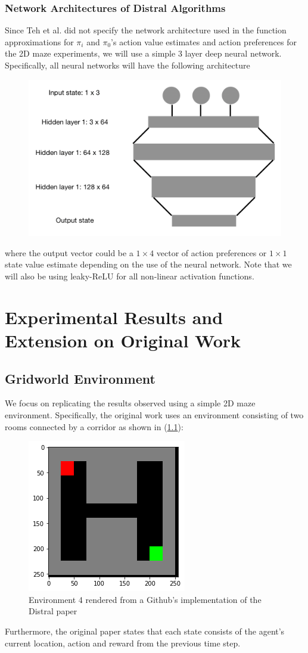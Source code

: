 \documentclass[12pt]{report}
\begin{document}
\subsection{Network Architectures of Distral Algorithms}

Since Teh et al. \cite{teh2017distral} did not specify the network architecture used in the function approximations for $\pi_i$ and $\pi_0$'s action value estimates and action preferences for the 2D maze experiments, we will use a simple 3 layer deep neural network. Specifically, all neural networks will have the following architecture
\begin{figure}[H]
    \center
    \includegraphics[width=0.6\linewidth]{figs/nn_architecture.png}
    \label{fig:nn_arch}
\end{figure}
where the output vector could be a $1 \times 4$ vector of action preferences or $1 \times 1$ state value estimate depending on the use of the neural network. Note that we will also be using leaky-ReLU for all non-linear activation functions.

\chapter{Experimental Results and Extension on Original Work}
\section{Gridworld Environment}

We focus on replicating the results observed using a simple 2D maze environment. Specifically, the original work \cite{teh2017distral} uses an environment consisting of two rooms connected by a corridor as shown in (\ref{fig4.1}):
\begin{figure}[H]
    \center
    \includegraphics[width=0.3\linewidth]{figs/grid4.png}
    \caption{Environment 4 rendered from a Github's \cite{alfredo_github} implementation of the Distral paper}
    \label{fig4.1}
\end{figure}
Furthermore, the original paper states that each state consists of the agent's current location, action and reward from the previous time step.\\
\end{document}
